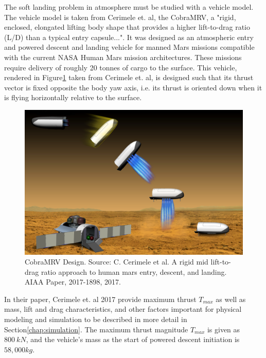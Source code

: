 The soft landing problem in atmosphere must be studied with a vehicle model. The vehicle model is taken from Cerimele et. al\:\cite{CERIMELE}, the CobraMRV, a "rigid, enclosed, elongated lifting body shape that provides a higher lift-to-drag ratio (L/D) than a typical entry capsule...". It was designed as an atmospheric entry and powered descent and landing vehicle for manned Mars missions compatible with the current NASA Human Mars mission architectures. These missions require delivery of roughly 20 tonnes of cargo to the surface. This vehicle, rendered in Figure\:\ref{fig:CobraMRV} taken from Cerimele et. al, is designed such that its thrust vector is fixed opposite the body yaw axis, i.e. its thrust is oriented down when it is flying horizontally relative to the surface. 

\begin{figure}[H]
	\centering
	\begin{minipage}{4.5 in}
		\includegraphics[width=\linewidth]{Figures/CobraMRV.png}
		\caption{CobraMRV Design. Source: C. Cerimele et al. A rigid mid lift-to-drag ratio approach to human mars entry, descent,
			and landing. AIAA Paper, 2017-1898, 2017. \label{fig:CobraMRV} }
	\end{minipage}
\end{figure}

In their paper, Cerimele et. al 2017\:\cite{CERIMELE} provide maximum thrust $T_{max}$ as well as mass, lift and drag characteristics, and other factors important for physical modeling and simulation to be described in more detail in Section\:\ref{chap:simulation}. The maximum thrust magnitude $T_{max}$ is given as $800\:kN$, and the vehicle's mass as the start of powered descent initiation is $58,000 kg$. 

